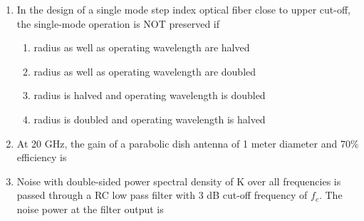 \documentclass[a4paper, 11pt]{article}
\begin{document}
\begin{enumerate}
    \hfill{}
    
    \item In the design of a single mode step index optical fiber close to upper cut-off, the single-mode operation is NOT preserved if
    \begin{enumerate}
        \item radius as well as operating wavelength are halved
        \item radius as well as operating wavelength are doubled
        \item radius is halved and operating wavelength is doubled
        \item radius is doubled and operating wavelength is halved
    \end{enumerate}
    
    \hfill{}

    \item At 20 GHz, the gain of a parabolic dish antenna of 1 meter diameter and 70\% efficiency is
    \begin{enumerate}
    \end{enumerate}
    
    \hfill{}
    
    \item Noise with double-sided power spectral density of K over all frequencies is passed through a RC low pass filter with 3 dB cut-off frequency of $f_c$. The noise power at the filter output is
    \begin{enumerate}
    \end{enumerate}
    
    \hfill{}


\end{enumerate}
\end{document}
